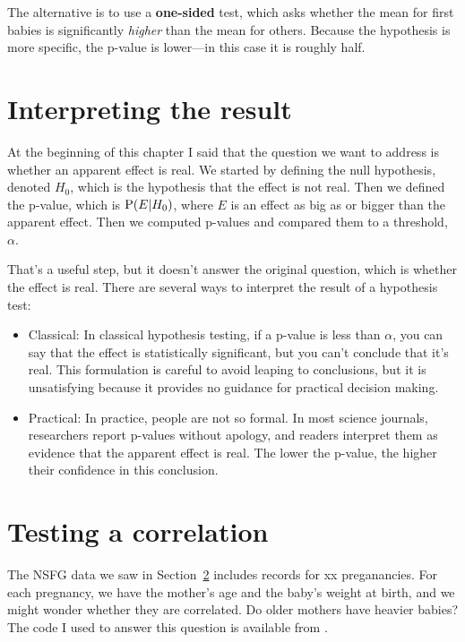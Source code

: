 \documentclass[12pt]{book}
\begin{document}
The alternative is to use a {\bf one-sided} test, which asks whether
the mean for first babies is significantly {\em higher} than
the mean for others.  Because the hypothesis is more specific, the
p-value is lower---in this case it is roughly half.


\section{Interpreting the result}

At the beginning of this chapter I said that the question we want to
address is whether an apparent effect is real.  We started by defining
the null hypothesis, denoted $H_{0}$, which is the hypothesis that
the effect is not real.  Then we defined the p-value, which is
$\mathrm{P}(E|H_{0})$, where $E$ is an effect as big as or bigger
than the apparent effect.  Then we computed p-values and compared them
to a threshold, $\alpha$.

That's a useful step, but it doesn't answer the original question,
which is whether the effect is real.  There are several ways to
interpret the result of a hypothesis test:

\begin{itemize}

\item Classical: In classical hypothesis testing, if a p-value
  is less than $\alpha$, you can say that the effect is statistically
  significant, but you can't conclude that it's real.  This
  formulation is careful to avoid leaping to conclusions, but it is
  unsatisfying because it provides no guidance for practical
  decision making.

\item Practical: In practice, people are not so formal.  In most
  science journals, researchers report p-values without apology, and
  readers interpret them as evidence that the apparent effect is real.
  The lower the p-value, the higher their confidence in this
  conclusion.

\end{itemize}


\section{Testing a correlation}

The NSFG data we saw in Section~\ref{} includes records for
xx preganancies.  For each pregnancy, we have the mother's age
and the baby's weight at birth, and we might wonder whether they
are correlated.  Do older mothers have heavier babies?  The
code I used to answer this question is available from
\url{}.
\end{document}
